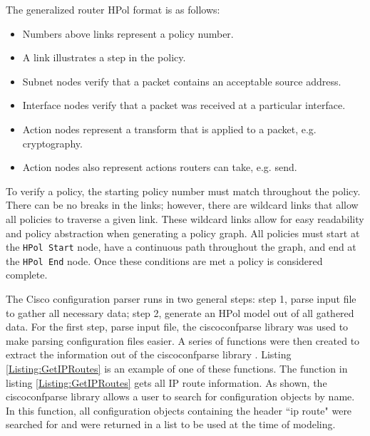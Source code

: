 \documentclass[12pt,letterpaper]{report}
\newcommand{\node}[1]{\texttt{#1}}
\begin{document}
{The generalized router HPol format is as follows:}
\begin{itemize}
	\item{Numbers above links represent a policy number.}
	\item{A link illustrates a step in the policy.}
	\item{Subnet nodes verify that a packet contains an acceptable source address.}
	\item{Interface nodes verify that a packet was received at a particular interface.}
	\item{Action nodes represent a transform that is applied to a packet, e.g. cryptography.}
	\item{Action nodes also represent actions routers can take, e.g. send.}
\end{itemize}

{To verify a policy, the starting policy number must match throughout the policy. There can be no breaks in the links; however, there are wildcard links that allow all policies to traverse a given link. These wildcard links allow for easy readability and policy abstraction when generating a policy graph. All policies must start at the \node{HPol Start} node, have a continuous path throughout the graph, and end at the \node{HPol End} node. Once these conditions are met a policy is considered complete.}

The Cisco configuration parser runs in two general steps: step 1, parse input file to gather all necessary data; step 2, generate an HPol model out of all gathered data. For the first step, parse input file, the ciscoconfparse library was used to make parsing configuration files easier. A series of functions were then created to extract the information out of the ciscoconfparse library \cite{ciscoconfparse}. Listing \ref{Listing:GetIPRoutes} is an example of one of these functions. The function in listing \ref{Listing:GetIPRoutes} gets all IP route information. As shown, the ciscoconfparse library allows a user to search for configuration objects by name. In this function, all configuration objects containing the header ``ip route" were searched for and were returned in a list to be used at the time of modeling.


\end{document}

